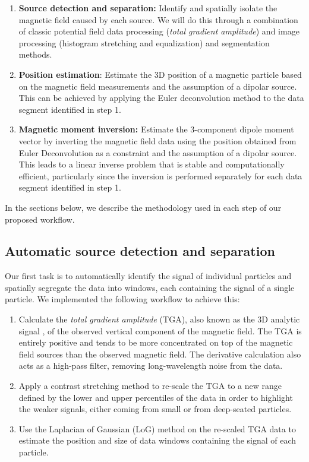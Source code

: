 \begin{enumerate}
\item \textbf{Source detection and separation:} Identify and spatially isolate
  the magnetic field caused by each source. We will do this through a
  combination of classic potential field data processing (\textit{total
  gradient amplitude}) and image processing (histogram stretching and
  equalization) and segmentation methods.
\item \textbf{Position estimation}: Estimate the 3D position of a magnetic
  particle based on the magnetic field measurements and the assumption of a
  dipolar source. This can be achieved by applying the Euler deconvolution
  method to the data segment identified in step 1.
\item \textbf{Magnetic moment inversion:} Estimate the 3-component dipole
  moment vector by inverting the magnetic field data using the position
  obtained from Euler Deconvolution as a constraint and the assumption of a
  dipolar source. This leads to a linear inverse problem that is stable and
  computationally efficient, particularly since the inversion is performed
  separately for each data segment identified in step 1.
\end{enumerate}

In the sections below, we describe the methodology used in each step of our
proposed workflow.

\subsection{Automatic source detection and separation}

Our first task is to automatically identify the signal of individual particles
and spatially segregate the data into windows, each containing the signal of a
single particle. We implemented the following workflow to achieve this:

\begin{enumerate}
\item Calculate the \textit{total gradient amplitude} (TGA), also known as the 3D analytic signal \citep{Roest1992Magnetic}, of the observed vertical   component of the magnetic field. The TGA is entirely positive and tends to be more concentrated on top of the magnetic field sources than the observed magnetic field. The derivative calculation also acts as a high-pass filter, removing long-wavelength noise from the data.
\item Apply a contrast stretching method to re-scale the TGA to a new range defined by the lower and upper percentiles of the data in order to highlight the weaker signals, either coming from small or from deep-seated particles.
\item Use the Laplacian of Gaussian (LoG) method \citep{VanderWalt2014} on the re-scaled TGA data to estimate the position and size of data windows containing the signal of each particle.
\end{enumerate}

